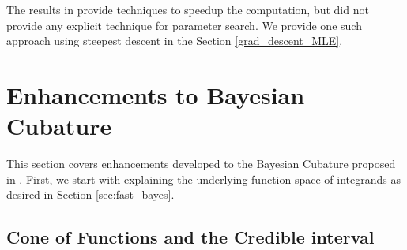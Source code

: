 \documentclass{svjour3}                     %
\newcommand{\NICE}{\textup{nice}}
\newcommand{\JRNote}[1]{{\textcolor{green}{JR: #1}}}
\begin{document}
The results in \cite{JagHic19a} provide techniques to speedup the computation, but did not provide any explicit technique for parameter search. We provide one such approach using steepest descent in the Section \ref{grad_descent_MLE}. 









\section{Enhancements to Bayesian Cubature}
\label{sec:bayes-cub-enhancements}


This section covers enhancements developed to the Bayesian Cubature proposed in \cite{JagHic19a}. First, we start with explaining the underlying function space of  integrands as desired in Section \ref{sec:fast_bayes}.









\subsection{Cone of Functions and the Credible interval} %
\label{sec:cone_of_functions}

\end{document}
